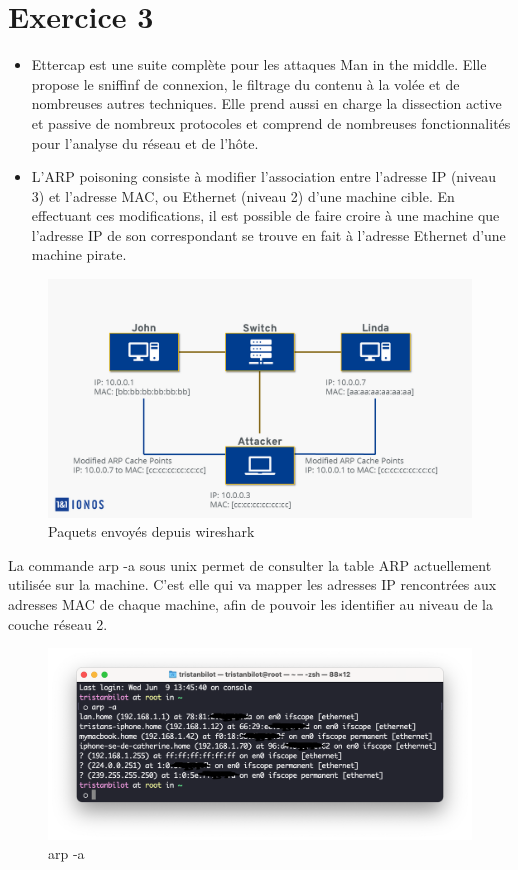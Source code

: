 \documentclass[12pt, oneside]{article}
\begin{document}
\section{Exercice 3}
\begin{itemize}
\item Ettercap est une suite complète pour les attaques Man in the middle. Elle propose le sniffinf de connexion, le filtrage du contenu à la volée et de nombreuses autres techniques. Elle prend aussi en charge la dissection active et passive de nombreux protocoles et comprend de nombreuses fonctionnalités pour l'analyse du réseau et de l'hôte.
\item L'ARP poisoning consiste à modifier l'association entre l'adresse IP (niveau 3) et l’adresse MAC, ou Ethernet (niveau 2) d'une machine cible. En effectuant ces modifications, il est possible de faire croire à une machine que l'adresse IP de son correspondant se trouve en fait à l'adresse Ethernet d'une machine pirate.
\end{itemize}
\begin{figure}[H]
\centering
\includegraphics[scale=0.4]{arp_spoofing}
\caption{Paquets envoyés depuis wireshark}
\end{figure}
La commande arp -a sous unix permet de consulter la table ARP actuellement utilisée sur la machine. C'est elle qui va mapper les adresses IP rencontrées aux adresses MAC de chaque machine, afin de pouvoir les identifier au niveau de la couche réseau 2.
\begin{figure}[H]
\centering
\includegraphics[scale=0.4]{arpa}
\caption{arp -a}
\end{figure}
\end{document}

